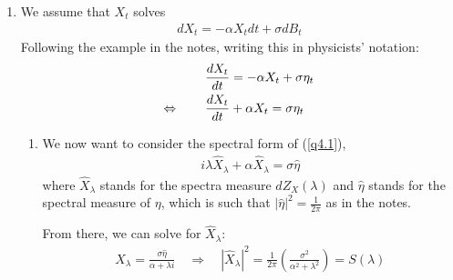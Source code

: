 \documentclass[12pt]{article}
\theoremstyle{plain}
\theoremstyle{definition}
\theoremstyle{remark}
\begin{document}
\begin{enumerate}
  \item %
    We assume that $X_t$ solves
    \begin{align*}
      dX_t = -\alpha X_t dt + \sigma dB_t
    \end{align*}
    Following the example in the notes, writing this in physicists' notation:
    \begin{align}
      \frac{dX_t}{dt} &= -\alpha X_t + \sigma \eta_t \notag \\
      \Leftrightarrow\qquad
      \frac{dX_t}{dt} &+\alpha X_t =  \sigma \eta_t
      \label{q4.1}
    \end{align}
    \begin{enumerate}
      \item
        We now want to consider the spectral form of (\ref{q4.1}),
        \begin{align*}
          i\lambda \hat{X}_\lambda + \alpha \hat{X}_\lambda = \sigma \hat{\eta}
        \end{align*}
        where $\hat{X}_\lambda$ stands for the spectra measure
        $dZ_X(\lambda)$ and $\hat{\eta}$ stands for the spectral measure
        of $\eta$, which is such that $|\hat{\eta}|^2 = \frac{1}{2\pi}$
        as in the notes.

        From there, we can solve for $\hat{X}_\lambda$:
        \begin{align*}
          \hat{X}_\lambda = \frac{\sigma \hat{\eta}}{\alpha + \lambda i}
          \quad\Rightarrow\quad
          |\hat{X}_\lambda|^2 = \frac{1}{2\pi}
          \left(\frac{\sigma^2}{\alpha^2 + \lambda^2}\right)
          = S(\lambda)
        \end{align*}


\end{enumerate}
\end{enumerate}
\end{document}
